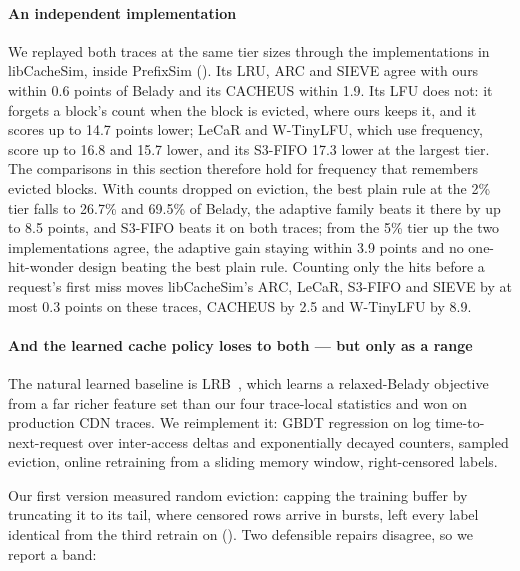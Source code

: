 \paragraph{An independent implementation} We replayed both traces at the same tier sizes through the
implementations in libCacheSim, inside PrefixSim (). Its LRU, ARC and SIEVE agree with ours
within 0.6 points of Belady and its CACHEUS within 1.9. Its LFU does not: it forgets a block's count when the
block is evicted, where ours keeps it, and it scores up to 14.7 points lower; LeCaR and W-TinyLFU, which use
frequency, score up to 16.8 and 15.7 lower, and its S3-FIFO 17.3 lower at the largest tier. The comparisons in
this section therefore hold for frequency that remembers evicted blocks. With counts dropped on eviction, the
best plain rule at the 2\% tier falls to 26.7\% and 69.5\% of Belady, the adaptive family beats it there by
up to 8.5 points, and S3-FIFO beats it on both traces; from the 5\% tier up the two implementations agree, the
adaptive gain staying within 3.9 points and no one-hit-wonder design beating the best plain rule. Counting
only the hits before a request's first miss moves libCacheSim's ARC, LeCaR, S3-FIFO and SIEVE by at most 0.3
points on these traces, CACHEUS by 2.5 and W-TinyLFU by 8.9.

\paragraph{And the learned cache policy loses to both --- but only as a range} The natural learned
baseline is LRB~\cite{S6_song2020lrb}, which learns a relaxed-Belady objective from
a far richer feature set than our four trace-local statistics and won on production CDN traces. We
reimplement it: GBDT regression on log time-to-next-request over inter-access deltas and exponentially
decayed counters, sampled eviction, online retraining from a sliding memory window, right-censored
labels.

Our first version measured random eviction: capping the training buffer by truncating it to its tail, where
censored rows arrive in bursts, left every label identical from the third retrain on (). Two
defensible repairs disagree, so we report a band:

